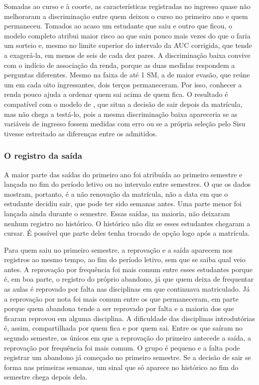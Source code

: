 \documentclass[12pt,a4paper]{article}
\begin{document}
Somadas ao curso e à coorte, as características registradas no ingresso quase não melhoraram a discriminação entre quem deixou o curso no primeiro ano e quem permaneceu. Tomados ao acaso um estudante que saiu e outro que ficou, o modelo completo atribui maior risco ao que saiu pouco mais vezes do que o faria um sorteio e, mesmo no limite superior do intervalo da AUC corrigida, que tende a exagerá-la, em menos de seis de cada dez pares. A discriminação baixa convive com o indício de associação da renda, porque as duas medidas respondem a perguntas diferentes. Mesmo na faixa de até 1 SM, a de maior evasão, que reúne um em cada oito ingressantes, dois terços permaneceram. Por isso, conhecer a renda pouco ajuda a ordenar quem sai acima de quem fica. O resultado é compatível com o modelo de \citet{tintoDropoutHigherEducation1975}, que situa a decisão de sair depois da matrícula, mas não chega a testá-lo, pois a mesma discriminação baixa apareceria se as variáveis de ingresso fossem medidas com erro ou se a própria seleção pelo Sisu tivesse estreitado as diferenças entre os admitidos.

\subsubsection{O registro da saída}
\label{sec:disc-registro}

A maior parte das saídas do primeiro ano foi atribuída ao primeiro semestre e lançada no fim do período letivo ou no intervalo entre semestres. O que os dados mostram, portanto, é a não renovação da matrícula, não a data em que o estudante decidiu sair, que pode ter sido semanas antes. Uma parte menor foi lançada ainda durante o semestre. Essas saídas, na maioria, não deixaram nenhum registro no histórico. O histórico não diz se esses estudantes chegaram a cursar. É possível que parte deles tenha trocado de opção logo após a matrícula.

Para quem saiu no primeiro semestre, a reprovação e a saída aparecem nos registros ao mesmo tempo, ao fim do período letivo, sem que se saiba qual veio antes. A reprovação por frequência foi mais comum entre esses estudantes porque é, em boa parte, o registro do próprio abandono, já que quem deixa de frequentar as aulas é reprovado por falta nas disciplinas em que continuava matriculado. Já a reprovação por nota foi mais comum entre os que permaneceram, em parte porque quem abandona tende a ser reprovado por falta e a maioria dos que ficaram reprovou em alguma disciplina. A dificuldade das disciplinas introdutórias é, assim, compartilhada por quem fica e por quem sai. Entre os que saíram no segundo semestre, os únicos em que a reprovação do primeiro antecede a saída, a reprovação por frequência foi mais comum. O grupo é pequeno e a falta pode registrar um abandono já começado no primeiro semestre. Se a decisão de sair se forma nas primeiras semanas, um sinal que só aparece no histórico ao fim do semestre chega depois dela.
\end{document}
